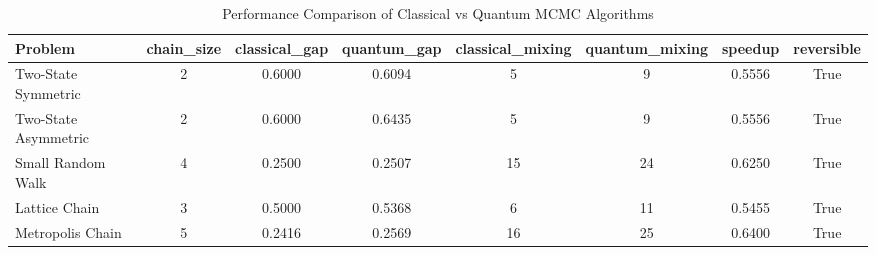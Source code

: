 \begin{table}
\caption{Performance Comparison of Classical vs Quantum MCMC Algorithms}
\label{tab:performance_comparison}
\begin{tabular}{lccccccc}
\toprule
Problem & chain_size & classical_gap & quantum_gap & classical_mixing & quantum_mixing & speedup & reversible \\
\midrule
Two-State Symmetric & 2 & 0.6000 & 0.6094 & 5 & 9 & 0.5556 & True \\
Two-State Asymmetric & 2 & 0.6000 & 0.6435 & 5 & 9 & 0.5556 & True \\
Small Random Walk & 4 & 0.2500 & 0.2507 & 15 & 24 & 0.6250 & True \\
Lattice Chain & 3 & 0.5000 & 0.5368 & 6 & 11 & 0.5455 & True \\
Metropolis Chain & 5 & 0.2416 & 0.2569 & 16 & 25 & 0.6400 & True \\
\bottomrule
\end{tabular}
\end{table}
